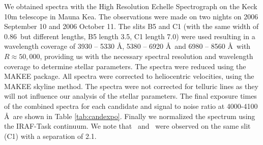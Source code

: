 We obtained spectra with the High Resolution Echelle Spectrograph \citep[HIRES][]{1994SPIE.2198..362V} on the Keck 10m telescope in Mauna Kea. The observations were made on two nights on 2006 September 10 and 2006 October 11.  The slits B5 and C1 (with the same width of 0.86\arcsec\ but different lengths, B5 length 3.5\arcsec, C1 length 7.0\arcsec) were used resulting in a wavelength coverage of 3930 -- 5330 \AA, 5380 -- 6920 \AA\ and 6980 -- 8560 \AA\ with $R\approx 50,000$, providing us with the necessary spectral resolution and wavelength coverage to determine stellar parameters. 
The spectra were reduced using the MAKEE package. All spectra were corrected to heliocentric velocities, using the MAKEE skyline method. The spectra were not corrected for telluric lines as they will not influence our analysis of the stellar parameters. The final exposure times of the combined spectra for each candidate and signal to noise ratio at 4000-4100 \AA\ are shown in Table \ref{tab:candexpo}. Finally we normalized the spectrum using the IRAF-Task continuum. We note that \starc\ and \stard\ were observed on the same slit (C1) with a separation of 2.1\arcsec.



